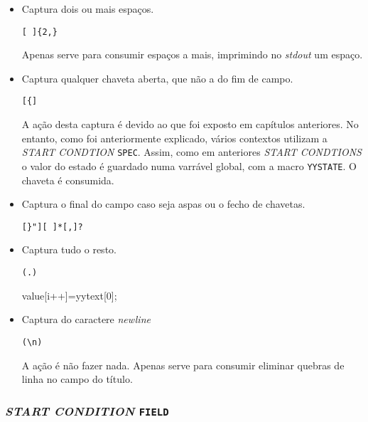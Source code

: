 \begin{itemize}
\item Captura dois ou mais espaços.
\begin{verbatim}
[ ]{2,}
\end{verbatim}

Apenas serve para consumir espaços a mais, imprimindo no \emph{stdout} um espaço.

\item Captura qualquer chaveta aberta, que não a do fim de campo.
\begin{verbatim}
[{]
\end{verbatim}

A ação desta captura é devido ao que foi exposto em capítulos anteriores. No entanto, como foi anteriormente explicado, vários contextos utilizam a \emph{START CONDTION} \texttt{SPEC}. Assim, como em anteriores \emph{START CONDTIONS} o valor do estado é guardado numa varrável global, com a macro \texttt{YYSTATE}. O chaveta é consumida.

\item Captura o final do campo caso seja aspas ou o fecho de chavetas.
\begin{verbatim}
[}"][ ]*[,]? 
\end{verbatim}

\item Captura tudo o resto.
\begin{verbatim}
(.)
\end{verbatim}
{value[i++]=yytext[0];}

\item Captura do caractere \emph{newline}
\begin{verbatim}
(\n)
\end{verbatim}

A ação é não fazer nada. Apenas serve para consumir eliminar quebras de linha no campo do título.


\end{itemize}

\subsubsection{\emph{START CONDITION} \texttt{FIELD}}

